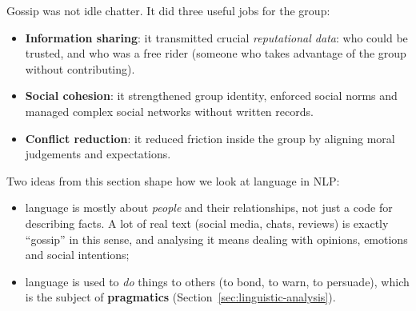 Gossip was not idle chatter. It did three useful jobs for the group:
\begin{itemize}[nosep]
  \item \textbf{Information sharing}: it transmitted crucial \emph{reputational data}:
        who could be trusted, and who was a free rider (someone who takes advantage of
        the group without contributing).
  \item \textbf{Social cohesion}: it strengthened group identity, enforced social norms
        and managed complex social networks without written records.
  \item \textbf{Conflict reduction}: it reduced friction inside the group by aligning
        moral judgements and expectations.
\end{itemize}

\begin{nbwhy}
Two ideas from this section shape how we look at language in NLP:
\begin{itemize}[nosep]
  \item language is mostly about \emph{people} and their relationships, not just a code
        for describing facts. A lot of real text (social media, chats, reviews) is
        exactly ``gossip'' in this sense, and analysing it means dealing with opinions,
        emotions and social intentions;
  \item language is used to \emph{do} things to others (to bond, to warn, to persuade),
        which is the subject of \textbf{pragmatics}
        (Section~\ref{sec:linguistic-analysis}).
\end{itemize}
\end{nbwhy}

